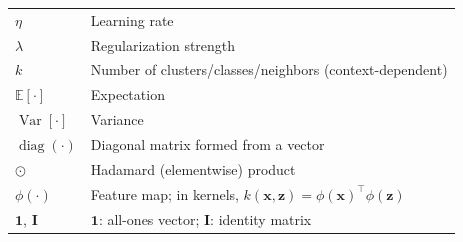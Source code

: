 \begin{table}[h]
\begin{tabular}{@{}ll@{}}
$\eta$ & Learning rate \\
$\lambda$ & Regularization strength \\
$k$ & Number of clusters/classes/neighbors (context-dependent) \\
$\mathbb{E}[\cdot]$ & Expectation \\
$\operatorname{Var}[\cdot]$ & Variance \\
$\operatorname{diag}(\cdot)$ & Diagonal matrix formed from a vector \\
$\odot$ & Hadamard (elementwise) product \\
$\phi(\cdot)$ & Feature map; in kernels, $k(\mathbf{x},\mathbf{z})=\phi(\mathbf{x})^\top\phi(\mathbf{z})$ \\
$\mathbf{1}$, $\mathbf{I}$ & \(\mathbf{1}\): all-ones vector; \(\mathbf{I}\): identity matrix \\
\bottomrule
\end{tabular}
\end{table}
\endgroup

